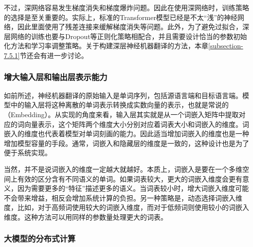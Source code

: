 \parinterval 不过，深网络容易发生梯度消失和梯度爆炸问题。因此在使用深网络时，训练策略的选择是至关重要的。实际上，标准的Transformer模型已经是不太``浅''的神经网络，因此里面使用了残差连接来缓解梯度消失等问题。此外，为了避免过拟合，深层网络的训练也要与Dropout等正则化策略相配合，并且需要设计恰当的参数初始化方法和学习率调整策略。关于构建深层神经机器翻译的方法，本章\ref{subsection-7.5.1}节还会有进一步讨论。


\subsubsection{增大输入层和输出层表示能力}

\parinterval 如前所述，神经机器翻译的原始输入是单词序列，包括源语言端和目标语言端。模型中的输入层将这种离散的单词表示转换成实数向量的表示，也就是常说的{\small{}}（Embedding）。从实现的角度来看，输入层其实就是从一个词嵌入矩阵中提取对应的词向量表示，这个矩阵两个维度大小分别对应着词表大小和词嵌入的维度。词嵌入的维度也代表着模型对单词刻画的能力。因此适当增加词嵌入的维度也是一种增加模型容量的手段。通常，词嵌入和隐藏层的维度是一致的，这种设计也是为了便于系统实现。

\parinterval 当然，并不是说词嵌入的维度一定越大就越好。本质上，词嵌入是要在一个多维空间上有效的区分含有不同语义的单词。如果词表较大，更大的词嵌入维度会更有意义，因为需要更多的``特征''描述更多的语义。当词表较小时，增大词嵌入维度可能不会带来增益，相反会增加系统计算的负担。另一种策略是，动态选择词嵌入维度，比如，对于高频词使用较大的词嵌入维度，而对于低频词则使用较小的词嵌入维度\cite{DBLP:conf/iclr/BaevskiA19}。这种方法可以用同样的参数量处理更大的词表。


\subsubsection{大模型的分布式计算}

